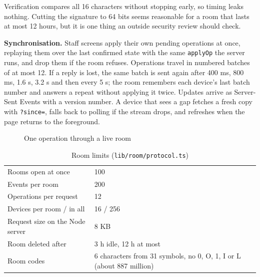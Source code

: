 \documentclass[10.5pt,a4paper]{article}
\newcommand{\toprl}{\arrayrulecolor{ink}\toprule\arrayrulecolor{rule}}
\newcommand{\code}[1]{\texttt{\small #1}}
\newcommand{\file}[1]{\leavevmode\textcolor{muted}{\texttt{\small #1}}}
\begin{document}
Verification compares all 16 characters without stopping early, so timing leaks nothing. Cutting the signature to 64
bits seems reasonable for a room that lasts at most 12 hours, but it is one thing an outside security review should
check.

\textbf{Synchronisation.} Staff screens apply their own pending operations at once, replaying them over the last
confirmed state with the same \code{applyOp} the server runs, and drop them if the room refuses. Operations travel in
numbered batches of at most 12. If a reply is lost, the same batch is sent again after 400 ms, 800 ms, 1.6 s, 3.2 s and
then every 5 s; the room remembers each device's last batch number and answers a repeat without applying it twice.
Updates arrive as Server-Sent Events with a version number. A device that sees a gap fetches a fresh copy with
\code{?since=}, falls back to polling if the stream drops, and refreshes when the page returns to the foreground.

\begin{figure}[!htbp]
\centering
{}
\caption{One operation through a live room}
\end{figure}

{\small
\begin{xltabular}{\textwidth}{@{}P{5.6cm}L@{}}
\caption{Room limits (\file{lib/room/protocol.ts})}\\
\toprl
Rooms open at once & 100\\
Events per room & 200\\
Operations per request & 12\\
Devices per room / in all & 16 / 256\\
Request size on the Node server & 8 KB\\
Room deleted after & 3 h idle, 12 h at most\\
Room codes & 6 characters from 31 symbols, no 0, O, 1, I or L (about 887 million)\\
\bottomrule
\end{xltabular}}
\end{document}

